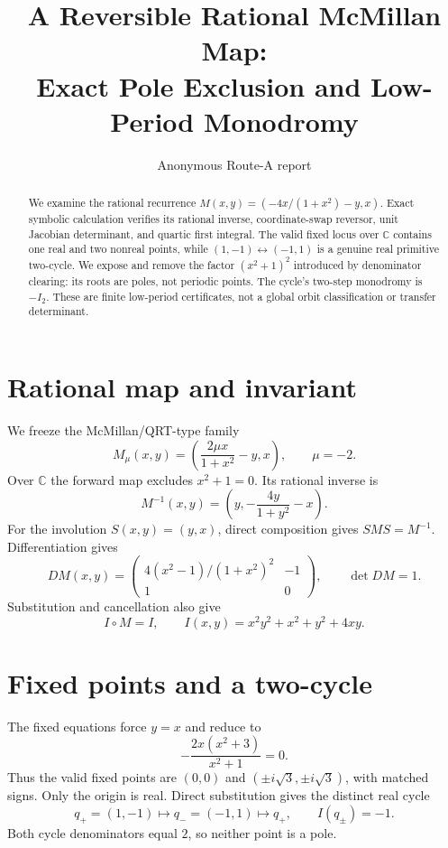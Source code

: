 \documentclass[10pt]{article}
\title{A Reversible Rational McMillan Map:\\Exact Pole Exclusion and Low-Period Monodromy}
\author{Anonymous Route-A report}
\date{}
\begin{document}
\maketitle
\begin{abstract}
We examine the rational recurrence
$M(x,y)=(-4x/(1+x^2)-y,x)$.  Exact symbolic calculation verifies its rational
inverse, coordinate-swap reversor, unit Jacobian determinant, and quartic first
integral.  The valid fixed locus over $\mathbb C$ contains one real and two
nonreal points, while $(1,-1)\leftrightarrow(-1,1)$ is a genuine real
primitive two-cycle.  We expose and remove the factor $(x^2+1)^2$ introduced
by denominator clearing: its roots are poles, not periodic points.  The
cycle's two-step monodromy is $-I_2$.  These are finite low-period
certificates, not a global orbit classification or transfer determinant.
\end{abstract}

\section{Rational map and invariant}
We freeze the McMillan/QRT-type family
\[
 M_\mu(x,y)=\left(\frac{2\mu x}{1+x^2}-y,x\right),\qquad \mu=-2.
\]
Over $\mathbb C$ the forward map excludes $x^2+1=0$.  Its rational inverse is
\[
 M^{-1}(x,y)=\left(y,-\frac{4y}{1+y^2}-x\right).
\]
For the involution $S(x,y)=(y,x)$, direct composition gives
$SMS=M^{-1}$.  Differentiation gives
\[
 DM(x,y)=\begin{pmatrix}
 4(x^2-1)/(1+x^2)^2&-1\\1&0
 \end{pmatrix},\qquad \det DM=1.
\]
Substitution and cancellation also give
\[
 I\circ M=I,\qquad I(x,y)=x^2y^2+x^2+y^2+4xy.
\]

\section{Fixed points and a two-cycle}
The fixed equations force $y=x$ and reduce to
\[
 -\frac{2x(x^2+3)}{x^2+1}=0.
\]
Thus the valid fixed points are $(0,0)$ and
$(\pm i\sqrt3,\pm i\sqrt3)$, with matched signs.  Only the origin is real.
Direct substitution gives the distinct real cycle
\[
 q_+=(1,-1)\longmapsto q_-=(-1,1)\longmapsto q_+,
 \qquad I(q_\pm)=-1.
\]
Both cycle denominators equal $2$, so neither point is a pole.
\end{document}
